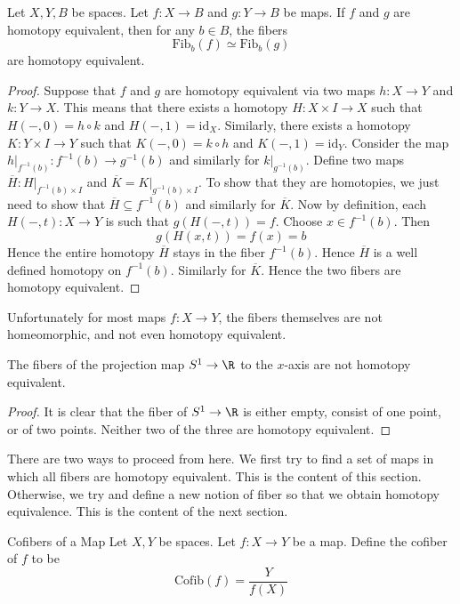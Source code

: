 \documentclass[a4paper]{article}
\begin{document}
\begin{prp}{}{} Let $X,Y,B$ be spaces. Let $f:X\to B$ and $g:Y\to B$ be maps. If $f$ and $g$ are homotopy equivalent, then for any $b\in B$, the fibers $$\text{Fib}_b(f)\simeq\text{Fib}_b(g)$$ are homotopy equivalent. \tcbline
\begin{proof}
Suppose that $f$ and $g$ are homotopy equivalent via two maps $h:X\to Y$ and $k:Y\to X$. This means that there exists a homotopy $H:X\times I\to X$ such that $H(-,0)=h\circ k$ and $H(-,1)=\text{id}_X$. Similarly, there exists a homotopy $K:Y\times I\to Y$ such that $K(-,0)=k\circ h$ and $K(-,1)=\text{id}_Y$. Consider the map $h|_{f^{-1}(b)}:f^{-1}(b)\to g^{-1}(b)$ and similarly for $k|_{g^{-1}(b)}$. Define two maps $\overline{H}:H|_{f^{-1}(b)\times I}$ and $\overline{K}=K|_{g^{-1}(b)\times I}$. To show that they are homotopies, we just need to show that $\overline{H}\subseteq f^{-1}(b)$ and similarly for $\overline{K}$. Now by definition, each $H(-,t):X\to Y$ is such that $g(H(-,t))=f$. Choose $x\in f^{-1}(b)$. Then $$g(H(x,t))=f(x)=b$$ Hence the entire homotopy $\overline{H}$ stays in the fiber $f^{-1}(b)$. Hence $\overline{H}$ is a well defined homotopy on $f^{-1}(b)$. Similarly for $\overline{K}$. Hence the two fibers are homotopy equivalent. 
\end{proof}
\end{prp}

Unfortunately for most maps $f:X\to Y$, the fibers themselves are not homeomorphic, and not even homotopy equivalent. 

\begin{eg}{}{} The fibers of the projection map $S^1\to\R$ to the $x$-axis are not homotopy equivalent. \tcbline
\begin{proof}
It is clear that the fiber of $S^1\to\R$ is either empty, consist of one point, or of two points. Neither two of the three are homotopy equivalent. 
\end{proof}
\end{eg}

There are two ways to proceed from here. We first try to find a set of maps in which all fibers are homotopy equivalent. This is the content of this section. Otherwise, we try and define a new notion of fiber so that we obtain homotopy equivalence. This is the content of the next section. 

\begin{defn}{Cofibers of a Map}{} Let $X,Y$ be spaces. Let $f:X\to Y$ be a map. Define the cofiber of $f$ to be $$\text{Cofib}(f)=\frac{Y}{f(X)}$$
\end{defn}
\end{document}
